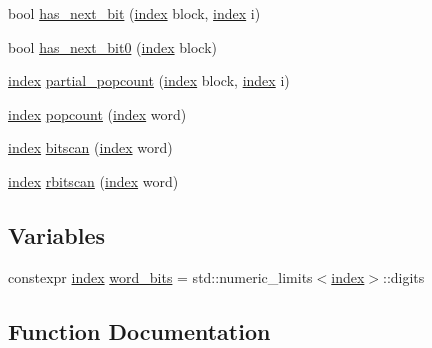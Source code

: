 \begin{DoxyCompactItemize}
\item 
bool \hyperlink{namespaceterraces_1_1bits_ade5941b5d275bf11611c59d27d3d699d}{has\+\_\+next\+\_\+bit} (\hyperlink{namespaceterraces_adbc33ccb543d1634e96d0eb02e472c77}{index} block, \hyperlink{namespaceterraces_adbc33ccb543d1634e96d0eb02e472c77}{index} i)
\item 
bool \hyperlink{namespaceterraces_1_1bits_ab0ef5fb720dacd43e4092bffb7022213}{has\+\_\+next\+\_\+bit0} (\hyperlink{namespaceterraces_adbc33ccb543d1634e96d0eb02e472c77}{index} block)
\item 
\hyperlink{namespaceterraces_adbc33ccb543d1634e96d0eb02e472c77}{index} \hyperlink{namespaceterraces_1_1bits_ae9bc44ee1d6422ce98b49667672ebe8e}{partial\+\_\+popcount} (\hyperlink{namespaceterraces_adbc33ccb543d1634e96d0eb02e472c77}{index} block, \hyperlink{namespaceterraces_adbc33ccb543d1634e96d0eb02e472c77}{index} i)
\item 
\hyperlink{namespaceterraces_adbc33ccb543d1634e96d0eb02e472c77}{index} \hyperlink{namespaceterraces_1_1bits_a3e8ce4c31cfec4642945190c2a364321}{popcount} (\hyperlink{namespaceterraces_adbc33ccb543d1634e96d0eb02e472c77}{index} word)
\item 
\hyperlink{namespaceterraces_adbc33ccb543d1634e96d0eb02e472c77}{index} \hyperlink{namespaceterraces_1_1bits_ac5218845131589e0357e909d9fd41a12}{bitscan} (\hyperlink{namespaceterraces_adbc33ccb543d1634e96d0eb02e472c77}{index} word)
\item 
\hyperlink{namespaceterraces_adbc33ccb543d1634e96d0eb02e472c77}{index} \hyperlink{namespaceterraces_1_1bits_a8b6b7055638e4550e4ddb50e0bd7d602}{rbitscan} (\hyperlink{namespaceterraces_adbc33ccb543d1634e96d0eb02e472c77}{index} word)
\end{DoxyCompactItemize}
\subsection*{Variables}
\begin{DoxyCompactItemize}
\item 
constexpr \hyperlink{namespaceterraces_adbc33ccb543d1634e96d0eb02e472c77}{index} \hyperlink{namespaceterraces_1_1bits_a28c9241b715c016e03707018a33b6350}{word\+\_\+bits} = std\+::numeric\+\_\+limits$<$\hyperlink{namespaceterraces_adbc33ccb543d1634e96d0eb02e472c77}{index}$>$\+::digits
\end{DoxyCompactItemize}


\subsection{Function Documentation}
\mbox{\label{namespaceterraces_1_1bits_ad5a8d095df6a0b6ff47728a0e9325860}} 
